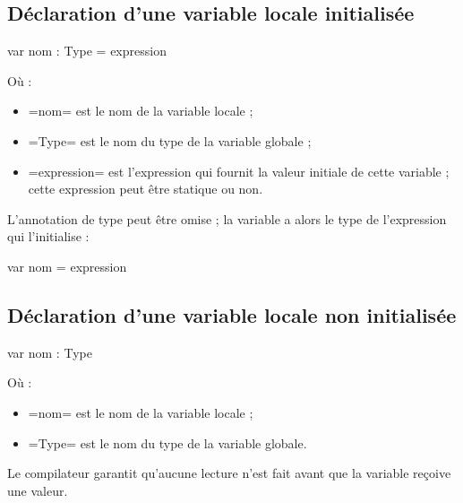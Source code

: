 \subsection{Déclaration d'une variable locale initialisée}

\begin{PLM}
var nom : Type = expression
\end{PLM}

Où :
\begin{itemize}
  \item \plm=nom= est le nom de la variable locale ;
  \item \plm=Type= est le nom du type de la variable globale ;
  \item \plm=expression= est l'expression qui fournit la valeur initiale de cette variable ; cette expression peut être statique ou non.
\end{itemize}

L'annotation de type peut être omise ; la variable a alors le type de l'expression qui l'initialise :
\begin{PLM}
var nom = expression
\end{PLM}


\subsection{Déclaration d'une variable locale non initialisée}
\begin{PLM}
var nom : Type
\end{PLM}
Où :
\begin{itemize}
  \item \plm=nom= est le nom de la variable locale ;
  \item \plm=Type= est le nom du type de la variable globale.
\end{itemize}

Le compilateur garantit qu'aucune lecture n'est fait avant que la variable reçoive une valeur.

